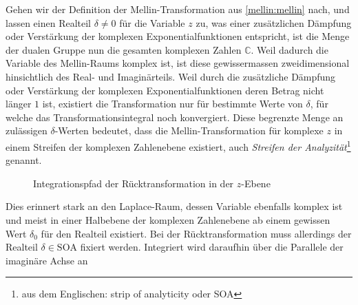 Gehen wir der Definition der Mellin-Transformation aus 
\eqref{mellin:mellin} nach, und lassen einen Realteil 
$\delta \neq 0$ für die Variable $z$ zu, was einer zusätzlichen 
Dämpfung oder Verstärkung der komplexen Exponentialfunktionen 
entspricht, ist die Menge der dualen Gruppe nun die gesamten 
komplexen Zahlen $\mathbb{C}$.
Weil dadurch die Variable des Mellin-Raums komplex ist, ist diese 
gewissermassen zweidimensional hinsichtlich des Real- und 
Imaginärteils. 
Weil durch die zusätzliche Dämpfung oder Verstärkung der komplexen 
Exponentialfunktionen deren Betrag nicht länger $1$ ist, existiert 
die Transformation nur für bestimmte Werte von $\delta$, für welche 
das Transformationsintegral noch konvergiert.
Diese begrenzte Menge an zulässigen $\delta$-Werten bedeutet, dass 
die Mellin-Transformation für komplexe $z$ in einem Streifen der 
komplexen Zahlenebene existiert, auch 
{\em Streifen der Analyzität}\footnote{aus dem Englischen: strip of 
analyticity oder SOA} genannt.
\begin{figure}
    \centering
    \caption{Integrationspfad der Rücktransformation in der $z$-Ebene
    \label{fig:mellin:z}}
\end{figure}
Dies erinnert stark an den Laplace-Raum, dessen Variable ebenfalls 
komplex ist und meist in einer Halbebene der komplexen Zahlenebene 
ab einem gewissen Wert $\delta_0$ für den Realteil existiert.
Bei der Rücktransformation muss allerdings der Realteil 
$\delta \in \text{SOA}$ fixiert werden. 
Integriert wird daraufhin über die Parallele der imaginäre Achse an 
